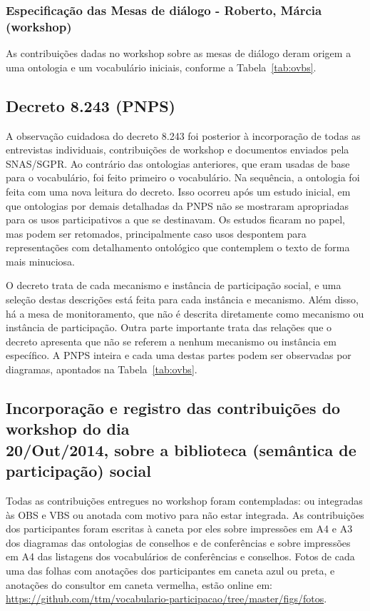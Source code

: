 \documentclass[12pt]{article}
\begin{document}
\subsubsection{Especificação das Mesas de diálogo - Roberto, Márcia (workshop)}
As contribuições dadas no workshop sobre as mesas de diálogo deram origem a uma ontologia e um vocabulário iniciais, conforme a Tabela~\ref{tab:ovbs}.


\subsection{Decreto 8.243 (PNPS)}\label{ap:pnps}
A observação cuidadosa do decreto 8.243 foi posterior à incorporação de todas as entrevistas individuais, contribuições de workshop e documentos enviados pela SNAS/SGPR. Ao contrário das ontologias anteriores, que eram usadas de base para o vocabulário, foi feito primeiro o vocabulário. Na sequência, a ontologia foi feita com uma nova leitura do decreto. Isso ocorreu após um estudo inicial, em que ontologias por demais detalhadas da PNPS não se mostraram apropriadas para os usos participativos a que se destinavam. Os estudos ficaram no papel, mas podem ser retomados, principalmente caso usos despontem para representações com detalhamento ontológico que contemplem o texto de forma mais minuciosa.

O decreto trata de cada mecanismo e instância de participação social, e uma seleção destas descrições está feita para cada instância e mecanismo. Além disso, há a mesa de monitoramento, que não é descrita diretamente como mecanismo ou instância de participação. Outra parte importante trata das relações que o decreto apresenta que não se referem a nenhum mecanismo ou instância em específico. A PNPS inteira e cada uma destas partes podem ser observadas por diagramas, apontados na Tabela~\ref{tab:ovbs}.

\subsection{Incorporação e registro das contribuições do workshop do dia \\20/Out/2014, sobre a biblioteca (semântica de participação) social}
Todas as contribuições entregues no workshop foram contempladas: ou integradas às OBS e VBS ou anotada com motivo para não estar integrada. As contribuições dos participantes foram escritas à caneta por eles sobre impressões em A4 e A3 dos diagramas das ontologias de conselhos e de conferências e sobre impressões em A4 das listagens dos vocabulários de conferências e conselhos. Fotos de cada uma das folhas com anotações dos participantes em caneta azul ou preta, e anotações do consultor em caneta vermelha, estão online em: \url{https://github.com/ttm/vocabulario-participacao/tree/master/figs/fotos}.
\end{document}
